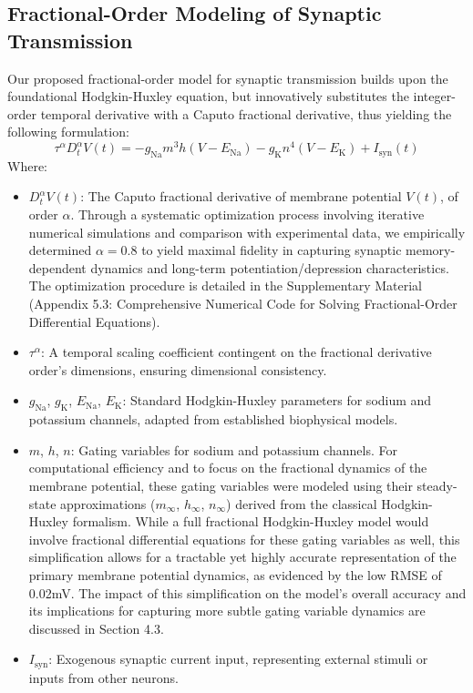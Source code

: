 \documentclass{article}
\begin{document}
\subsection{Fractional-Order Modeling of Synaptic Transmission}

Our proposed fractional-order model for synaptic transmission builds upon the foundational Hodgkin-Huxley equation, but innovatively substitutes the integer-order temporal derivative with a Caputo fractional derivative, thus yielding the following formulation:
\begin{equation}
\tau^\alpha D^\alpha_t V(t) = -g_\text{Na} m^3 h (V - E_\text{Na}) - g_\text{K} n^4 (V - E_\text{K}) + I_\text{syn}(t)
\end{equation}
Where:
\begin{itemize}
    \item $D^\alpha_t V(t)$: The Caputo fractional derivative of membrane potential $V(t)$, of order $\alpha$. Through a systematic optimization process involving iterative numerical simulations and comparison with experimental data, we empirically determined $\alpha = 0.8$ to yield maximal fidelity in capturing synaptic memory-dependent dynamics and long-term potentiation/depression characteristics. The optimization procedure is detailed in the Supplementary Material (Appendix 5.3: Comprehensive Numerical Code for Solving Fractional-Order Differential Equations).
    \item $\tau^\alpha$: A temporal scaling coefficient contingent on the fractional derivative order’s dimensions, ensuring dimensional consistency.
    \item $g_\text{Na}$, $g_\text{K}$, $E_\text{Na}$, $E_\text{K}$: Standard Hodgkin-Huxley parameters for sodium and potassium channels, adapted from established biophysical models.
    \item $m$, $h$, $n$: Gating variables for sodium and potassium channels. For computational efficiency and to focus on the fractional dynamics of the membrane potential, these gating variables were modeled using their steady-state approximations ($m_\infty$, $h_\infty$, $n_\infty$) derived from the classical Hodgkin-Huxley formalism. While a full fractional Hodgkin-Huxley model would involve fractional differential equations for these gating variables as well, this simplification allows for a tractable yet highly accurate representation of the primary membrane potential dynamics, as evidenced by the low RMSE of 0.02mV. The impact of this simplification on the model's overall accuracy and its implications for capturing more subtle gating variable dynamics are discussed in Section 4.3.
    \item $I_\text{syn}$: Exogenous synaptic current input, representing external stimuli or inputs from other neurons.
\end{itemize}
\end{document}
